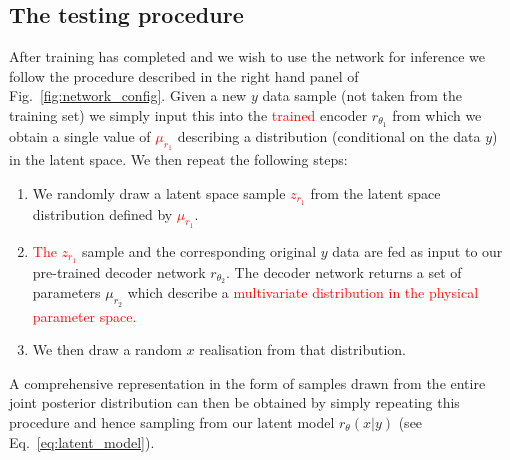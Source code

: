 \documentclass[%
showpacs,
nofootinbib,
 amsmath,amssymb,
 aps,
 twocolumn,
 prl,
 reprint,
floatfix,
]{revtex4-1}
\newcommand{\new}[1]{\textcolor{red}{#1}}
\begin{document}
\subsection{The testing procedure}
%
%
After training has completed and we wish to use the network for inference we
follow the procedure described in the right hand panel of
Fig.~\ref{fig:network_config}. Given a new $y$ data sample (not taken from the
training set) we simply input this into the \new{trained} encoder $r_{\theta_1}$ from
which we obtain a single value of \new{$\mu_{r_1}$} describing a distribution
(conditional on the data $y$) in the latent space. We then repeat the following
steps:

%
%
\begin{enumerate}
%
\item We randomly draw a latent space sample \new{$z_{r_1}$} from the latent space
distribution defined by \new{$\mu_{r_1}$}.
%
\item \new{The $z_{r_1}$} sample and the corresponding original $y$ data are fed as input to our
pre-trained decoder network $r_{\theta_2}$. The decoder network returns a set
of parameters $\mu_{r_2}$ which describe a \new{multivariate distribution in the physical
parameter space.}
%
\item We then draw a random $x$ realisation from that distribution.
%
\end{enumerate}
%

%
%
A comprehensive representation in the form of samples drawn from the entire
joint posterior distribution can then be obtained by simply repeating this
procedure and hence sampling from our latent model $r_{\theta}(x|y)$ (see
Eq.~\ref{eq:latent_model}).

\end{document}
